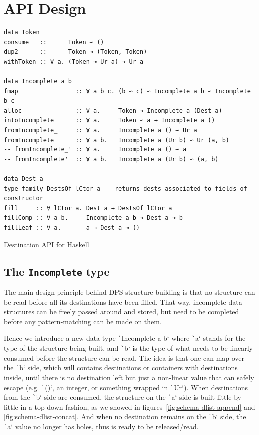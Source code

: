 \documentclass[english]{jflart}
\begin{document}
\section{API Design}\label{sec:api}

\begin{table}[t]
\small
\begin{verbatim}
data Token
consume   ::      Token ⊸ ()
dup2      ::      Token ⊸ (Token, Token)
withToken :: ∀ a. (Token ⊸ Ur a) ⊸ Ur a

data Incomplete a b
fmap                :: ∀ a b c. (b ⊸ c) ⊸ Incomplete a b ⊸ Incomplete b c
alloc               :: ∀ a.     Token ⊸ Incomplete a (Dest a)
intoIncomplete      :: ∀ a.     Token ⊸ a → Incomplete a ()
fromIncomplete_     :: ∀ a.     Incomplete a () ⊸ Ur a
fromIncomplete      :: ∀ a b.   Incomplete a (Ur b) ⊸ Ur (a, b)
-- fromIncomplete_' :: ∀ a.     Incomplete a () ⊸ a
-- fromIncomplete'  :: ∀ a b.   Incomplete a (Ur b) ⊸ (a, b)

data Dest a
type family DestsOf lCtor a -- returns dests associated to fields of constructor
fill     :: ∀ lCtor a. Dest a → DestsOf lCtor a
fillComp :: ∀ a b.     Incomplete a b ⊸ Dest a ⊸ b
fillLeaf :: ∀ a.       a → Dest a ⊸ ()
\end{verbatim}
\caption{Destination API for Haskell}
\label{table:destination-api}
\end{table}

\subsection{The \texttt{Incomplete} type}

The main design principle behind DPS structure building is that no structure can be read before all its destinations have been filled. That way, incomplete data structures can be freely passed around and stored, but need to be completed before any pattern-matching can be made on them.

Hence we introduce a new data type \texttt`Incomplete a b` where \texttt`a` stands for the type of the structure being built, and \texttt`b` is the type of what needs to be linearly consumed before the structure can be read. The idea is that one can map over the \texttt`b` side, which will contains destinations or containers with destinations inside, until there is no destination left but just a non-linear value that can safely escape (e.g. \texttt`()`, an integer, or something wrapped in \texttt`Ur`). When destinations from the \texttt`b` side are consumed, the structure on the \texttt`a` side is built little by little in a top-down fashion, as we showed in figures~\ref{fig:schema-dlist-append} and \ref{fig:schema-dlist-concat}. And when no destination remains on the \texttt`b` side, the \texttt`a` value no longer has holes, thus is ready to be released/read.
\end{document}
